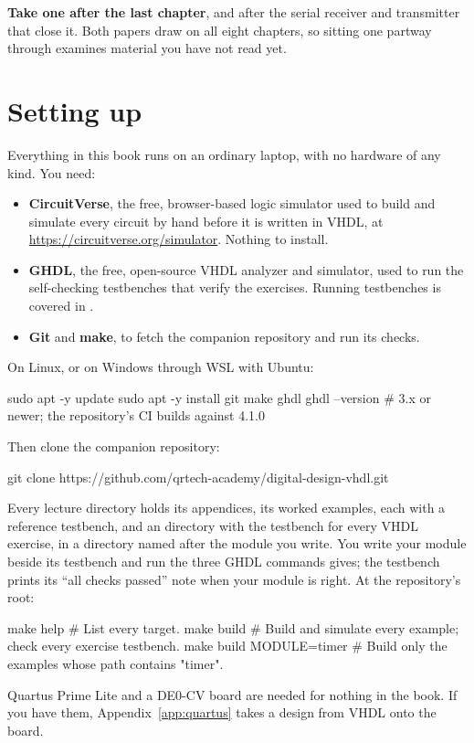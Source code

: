 \textbf{Take one after the last chapter}, and after the serial receiver and transmitter that close
it. Both papers draw on all eight chapters, so sitting one partway through examines material you
have not read yet.

\section*{Setting up}
Everything in this book runs on an ordinary laptop, with no hardware of any kind. You need:
\begin{itemize}
  \item \textbf{CircuitVerse}, the free, browser-based logic simulator used to build and simulate
    every circuit by hand before it is written in VHDL, at
    \url{https://circuitverse.org/simulator}. Nothing to install.
  \item \textbf{GHDL}, the free, open-source VHDL analyzer and simulator, used to run the
    self-checking testbenches that verify the exercises. Running testbenches is covered in
    .
  \item \textbf{Git} and \textbf{make}, to fetch the companion repository and run its checks.
\end{itemize}
On Linux, or on Windows through WSL with Ubuntu:

\begin{shell}
sudo apt -y update
sudo apt -y install git make ghdl
ghdl --version           # 3.x or newer; the repository's CI builds against 4.1.0
\end{shell}

\noindent Then clone the companion repository:

\begin{shell}
git clone https://github.com/qrtech-academy/digital-design-vhdl.git
\end{shell}

\noindent Every lecture directory holds its appendices, its worked examples, each with a reference
testbench, and an  directory with the testbench for every VHDL exercise, in a
directory named after the module you write. You write your module beside its testbench and run the
three GHDL commands  gives; the testbench prints its ``all checks passed'' note
when your module is right. At the repository's root:

\begin{shell}
make help                # List every target.
make build               # Build and simulate every example; check every exercise testbench.
make build MODULE=timer  # Build only the examples whose path contains "timer".
\end{shell}

\noindent Quartus Prime Lite and a DE0-CV board are needed for nothing in the book. If you have
them, Appendix~\ref{app:quartus} takes a design from VHDL onto the board.
